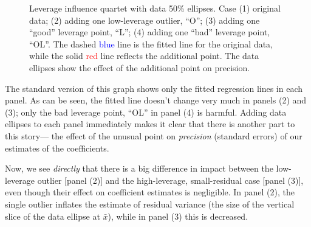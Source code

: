 \documentclass[
  letterpaper,
  10pt,
  krantz2]{krantz}
\begin{document}
{\begin{figure}[H]

\caption{\label{fig-levdemo}Leverage influence quartet with data 50\%
ellipses. Case (1) original data; (2) adding one low-leverage outlier,
``O''; (3) adding one ``good'' leverage point, ``L''; (4) adding one
``bad'' leverage point, ``OL''. The dashed \textcolor{blue}{blue} line
is the fitted line for the original data, while the solid
\textcolor{red}{red} line reflects the additional point. The data
ellipses show the effect of the additional point on precision.}

\end{figure}%

The standard version of this graph shows only the fitted regression
lines in each panel. As can be seen, the fitted line doesn't change very
much in panels (2) and (3); only the bad leverage point, ``OL'' in panel
(4) is harmful. Adding data ellipses to each panel immediately makes it
clear that there is another part to this story--- the effect of the
unusual point on \emph{precision} (standard errors) of our estimates of
the coefficients.

Now, we see \emph{directly} that there is a big difference in impact
between the low-leverage outlier {[}panel (2){]} and the high-leverage,
small-residual case {[}panel (3){]}, even though their effect on
coefficient estimates is negligible. In panel (2), the single outlier
inflates the estimate of residual variance (the size of the vertical
slice of the data ellipse at \(\bar{x}\)), while in panel (3) this is
decreased.

}
\end{document}
